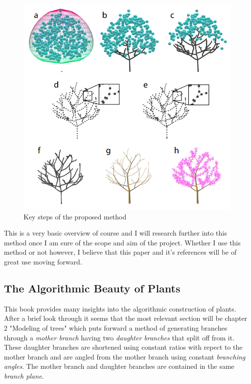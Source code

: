 \documentclass[proposal]{cmpreport}
\begin{document}
\begin{figure}[h]
        \caption{Key steps of the proposed method}
        \includegraphics[scale=0.47]{AttractionPoints}
        \centering
\end{figure}

This is a very basic overview of course and I will research further into this method 
once I am sure of the scope and aim of the project. Whether I use this method or not 
however, I believe that this paper and it's references will be of great use moving 
forward.

\subsection{The Algorithmic Beauty of Plants}
This book \cite{beautyOfPlants} provides many insights into the algorithmic construction 
of plants. After a brief look through it seems that the most relevant section will be 
chapter 2 "Modeling of trees" which puts forward a method of generating branches through 
a \textit{mother branch} having two \textit{daughter branches} that split off from it. 
These daughter branches are shortened using constant ratios with repect to the mother 
branch and are angled from the mother branch using constant \textit{branching angles}. 
The mother branch and daughter branches are contained in the same \textit{branch plane}.
\end{document}
